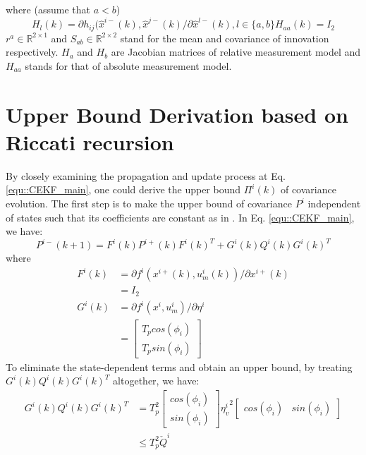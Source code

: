 \documentclass[conference]{IEEEtran}
\begin{document}
where (assume that $a<b$)
\begin{subequations}
	\begin{equation}
	H_l(k) = \partial h_{ij}(\hat{x}^{i-}(k),\hat{x}^{j-}(k)/\partial\hat{x}^{l-}(k), l\in\{a,b\}
	\end{equation}
	\begin{equation}
	H_{aa}(k) = I_{2}
	\end{equation}
\end{subequations}
$r^a\in \mathbb{R}^{2\times1}$ and $S_{ab}\in \mathbb{R}^{2\times2}$ stand for the mean and covariance of innovation respectively. $H_a$ and $H_b$ are Jacobian matrices of relative measurement model and $H_{aa}$ stands for that of absolute measurement model.

\section{Upper Bound Derivation based on Riccati recursion}
By closely examining the propagation and update process at Eq. \eqref{equ::CEKF_main}, one could derive the upper bound $\Pi^i(k)$ of covariance evolution.
The first step is to make the upper bound of covariance $P^i$ independent of states such that its coefficients are constant as in \cite{mourikis2006performance,chang2018optimal}.
In Eq. \eqref{equ::CEKF_main}, we have:
\begin{equation*}
	P^{i-}(k+1) = F^i(k)P^{i+}(k)F^i(k)^T + G^i(k)Q^i(k)G^i(k)^T
\end{equation*}
where
\begin{equation*}
\begin{split}
F^i(k) &= \partial f^i (x^{i+}(k),u_m^i(k))/\partial x^{i+}(k)
\\ & = I_{2}
\\G^i(k) &= \partial f^i (x^i,u_m^i)/\partial \eta^i \\ &=
\begin{bmatrix}
T_p cos(\phi_i) \\
T_p sin(\phi_i)
\end{bmatrix}
\end{split}
\end{equation*}
To eliminate the state-dependent terms and obtain an upper bound, by treating $G^i(k)Q^i(k)G^i(k)^T$ altogether, we have:
\begin{equation}
\begin{split}
G^i(k)Q^i(k)G^i(k)^T
&=T_p^2\begin{bmatrix} cos(\phi_i) \\ sin(\phi_i) \end{bmatrix} {\eta_v^{i}}^2
\begin{bmatrix} cos(\phi_i) & sin(\phi_i) \end{bmatrix}
\\&\leq T_p^2 \check{Q}^i
\end{split}
\end{equation}
\end{document}
